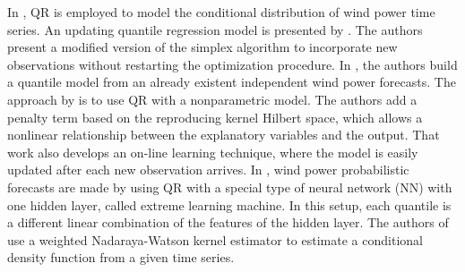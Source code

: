 In \cite{gallego2016line,moller_time-adaptive_2008,nielsen2006,bremnes_probabilistic_2004,wan_direct_2017}, QR is employed to model the conditional distribution of wind power time series.
An updating quantile regression model is presented by \cite{moller_time-adaptive_2008}. The authors present a modified version of the simplex algorithm to incorporate new observations without restarting the optimization procedure.
In \cite{nielsen2006}, the authors build a quantile model from an already existent independent wind power forecasts.
The approach by \cite{gallego2016line} is to use QR with a nonparametric model. The authors add a penalty term based on the reproducing kernel Hilbert space, which allows a nonlinear relationship between the explanatory variables and the output. That work also develops an on-line learning technique, where the model is easily updated after each new observation arrives.
In \cite{wan_direct_2017}, wind power probabilistic forecasts are made by using QR with a special type of neural network (NN) with one hidden layer, called extreme learning machine. In this setup, each quantile is a different linear combination of the features of the hidden layer.
The authors of \cite{cai_regression_2002} use a weighted Nadaraya-Watson kernel estimator to estimate a conditional density function from a given time series.


